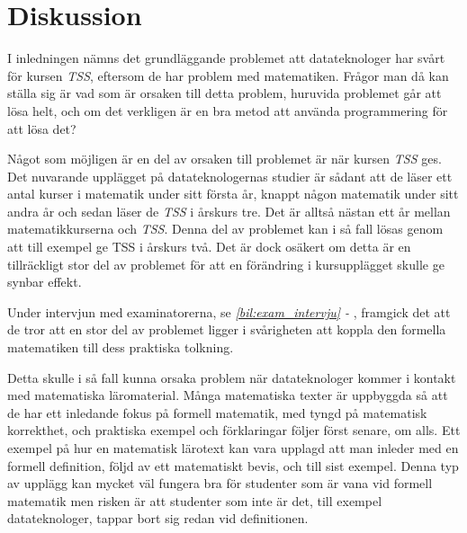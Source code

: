\documentclass[12pt,a4paper,twoside,openright]{article}
\begin{document}
\section{Diskussion}




I inledningen nämns det grundläggande problemet att datateknologer har
svårt för kursen \textit{TSS}, eftersom de har problem med
matematiken. Frågor man då kan ställa sig är vad som är orsaken till
detta problem, huruvida problemet går att lösa helt, och om det
verkligen är en bra metod att använda programmering för att lösa det?

Något som möjligen är en del av orsaken till problemet är när kursen
\textit{TSS} ges. Det nuvarande upplägget på datateknologernas studier
är sådant att de läser ett antal kurser i matematik under sitt första
år, knappt någon matematik under sitt andra år och sedan läser de
\textit{TSS} i årskurs tre. Det är alltså nästan ett år mellan
matematikkurserna och \textit{TSS}. Denna del av problemet kan i så
fall lösas genom att till exempel ge TSS i årskurs två. Det är dock
osäkert om detta är en tillräckligt stor del av problemet för att en
förändring i kursupplägget skulle ge synbar effekt.

Under intervjun med examinatorerna, se \textit{\ref{bil:exam_intervju} - }, framgick det
att de tror att en stor del av problemet ligger i svårigheten att
koppla den formella matematiken till dess praktiska tolkning.

Detta skulle i så fall kunna orsaka problem när datateknologer kommer
i kontakt med matematiska läromaterial. Många matematiska texter är
uppbyggda så att de har ett inledande fokus på formell matematik, med
tyngd på matematisk korrekthet, och praktiska exempel och förklaringar
följer först senare, om alls. Ett exempel på hur en matematisk
lärotext kan vara upplagd att man inleder med en formell definition,
följd av ett matematiskt bevis, och till sist exempel. Denna typ av
upplägg kan mycket väl fungera bra för studenter som är vana vid
formell matematik men risken är att studenter som inte är det, till
exempel datateknologer, tappar bort sig redan vid definitionen.
\end{document}
